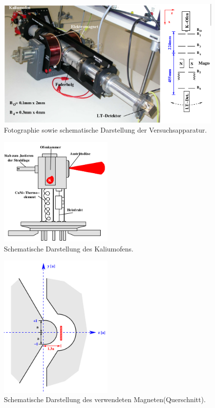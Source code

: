 \FloatBarrier
\begin{figure}
  \centering
  \includegraphics[width=\textwidth]{abbildungen/aufbau.png}
  \caption{Fotographie sowie schematische Darstellung der Versuchsapparatur.\cite{sample}}
  \label{fig:aufbau}
\end{figure}

\begin{figure}
  \centering
  \includegraphics[width=0.5\textwidth]{abbildungen/ofen.png}
  \caption{Schematische Darstellung des Kaliumofens.\cite{sample}}
  \label{fig:ofen}
\end{figure}

\begin{figure}
  \centering
  \includegraphics[width=0.5\textwidth]{abbildungen/magnet.png}
  \caption{Schematische Darstellung des verwendeten Magneten(Querschnitt).\cite{sample}}
  \label{fig:magnet}
\end{figure}
\FloatBarrier
